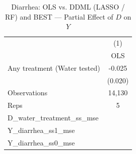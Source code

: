 \begin{table}[htbp]\centering
\def\sym#1{\ifmmode^{#1}\else\(^{#1}\)\fi}
\caption{Diarrhea: OLS vs. DDML (LASSO / RF) and BEST — Partial Effect of $D$ on $Y$}
\begin{tabular}{l*{1}{c}}
\toprule
                &\multicolumn{1}{c}{(1)}\\
                &\multicolumn{1}{c}{OLS}\\
\midrule
Any treatment (Water tested)&   -0.025         \\
                &  (0.020)         \\
\midrule
Observations    &   14,130         \\
Reps            &        5         \\
D\_water\_treatment\_ss\_mse&                  \\
Y\_diarrhea\_ss1\_mse&                  \\
Y\_diarrhea\_ss0\_mse&                  \\
\bottomrule
\end{tabular}
\end{table}
